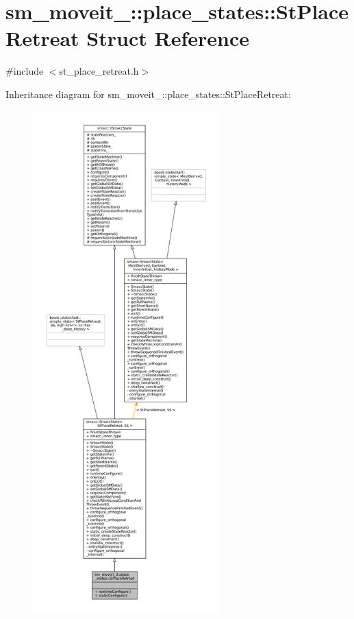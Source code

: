 \hypertarget{structsm__moveit__3_1_1place__states_1_1StPlaceRetreat}{}\section{sm\+\_\+moveit\+\_\+:\+:place\+\_\+states\+:\+:St\+Place\+Retreat Struct Reference}
\label{structsm__moveit__3_1_1place__states_1_1StPlaceRetreat}


{\ttfamily \#include $<$st\+\_\+place\+\_\+retreat.\+h$>$}



Inheritance diagram for sm\+\_\+moveit\+\_\+:\+:place\+\_\+states\+:\+:St\+Place\+Retreat\+:
\nopagebreak
\begin{figure}[H]
\begin{center}
\leavevmode
\includegraphics[height=550pt]{structsm__moveit__3_1_1place__states_1_1StPlaceRetreat__inherit__graph}
\end{center}
\end{figure}


